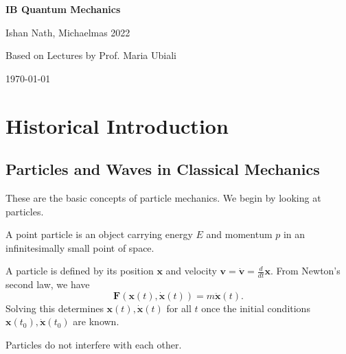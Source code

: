 \documentclass[12pt]{article}
\begin{document}
\hypersetup{pageanchor=false}
\begin{titlepage}
	\begin{center}
		\vspace*{1em}
		\Huge
		\textbf{IB Quantum Mechanics}

		\vspace{1em}
		\large
		Ishan Nath, Michaelmas 2022

		\vspace{1.5em}

		\Large

		Based on Lectures by Prof. Maria Ubiali

		\vspace{1em}

		\large
		\today
	\end{center}
	
\end{titlepage}
\hypersetup{pageanchor=true}

\tableofcontents

\newpage

\section{Historical Introduction}%
\label{sec:historical_introduction}

\subsection{Particles and Waves in Classical Mechanics}%
\label{sub:particles_and_waves_in_classical_mechanics}

These are the basic concepts of particle mechanics. We begin by looking at particles.

\begin{definition}
	A point particle is an object carrying energy $E$ and momentum $p$ in an infinitesimally small point of space.
\end{definition}

A particle is defined by its position $\mathbf{x}$ and velocity $\mathbf{v} = \mathbf{\dot v} = \frac{d}{dt} \mathbf{x}$. From Newton's second law, we have
\[
	\mathbf{F}(\mathbf{x}(t), \mathbf{\dot x}(t)) = m \mathbf{\ddot x}(t)
.\]
Solving this determines $\mathbf{x}(t), \mathbf{\dot x}(t)$ for all $t$ once the initial conditions $\mathbf{x}(t_0), \mathbf{\dot x}(t_0)$ are known.

Particles do not interfere with each other.
\end{document}
